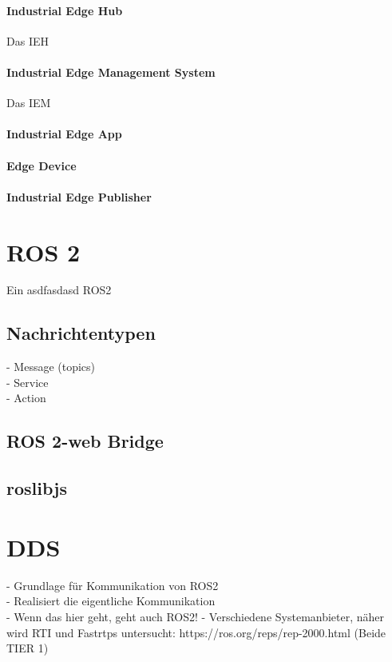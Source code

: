 			
		\paragraph{Industrial Edge Hub}
			Das \gls{IEH} 
			
		\paragraph{Industrial Edge Management System}
			Das \gls{IEM} 
			
		\paragraph{Industrial Edge App}
			
	
		\paragraph{Edge Device}
			
			
		\paragraph{Industrial Edge Publisher}
			

	
	\section{ROS 2}
	\label{Grundlagen:ROS2}
		Ein asdfasdasd
		\cite{ros2Basic}
		\gls{ROS2}
	

		\subsection{Nachrichtentypen}
		\label{Grundlagen:ROS2:Nachrichtentypen}
			- Message (topics)\\
			- Service\\
			- Action
			
		\subsection{ROS 2-web Bridge}
		\label{Grundlagen:ROS2:2WebBridge}
			
		\subsection{roslibjs}
		\label{Grundlagen:ROS2:RosLibJS}
	
	\section{DDS}
	\label{Grundlagen:DDS}
		- Grundlage für Kommunikation von ROS2\\
		- Realisiert die eigentliche Kommunikation\\
		- Wenn das hier geht, geht auch ROS2!
		- Verschiedene Systemanbieter, näher wird RTI und Fastrtps untersucht: https://ros.org/reps/rep-2000.html  (Beide TIER 1)
		
	
		
		

